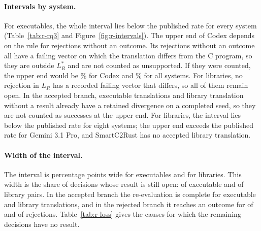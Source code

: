 \paragraph{Intervals by system.} For executables, the whole interval lies below the published rate for every system (Table~\ref{tab:r-rq3} and Figure~\ref{fig:r-intervals}). The upper end of Codex depends on the rule for rejections without an outcome. Its \rqSanBoundExeNNum{} rejections without an outcome all have a failing vector on which the translation differs from the C program, so they are outside $L_R^{\ast}$ and are not counted as unsupported. If they were counted, the upper end would be \rqSRUpNoLrStarExeAllCodexPct\% for Codex and \rqSRUpNoLrStarExeAllPct\% for all systems. For libraries, no rejection in $L_R$ has a recorded failing vector that differs, so all of them remain open. In the accepted branch, \rqLpStarRetExeAllNum{} executable translations and \rqLpStarRetLibAllNum{} library translation without a result already have a retained divergence on a completed seed, so they are not counted as successes at the upper end. For libraries, the interval lies below the published rate for eight systems; the upper end exceeds the published rate for Gemini 3.1 Pro, and SmartC2Rust has no accepted library translation.

\paragraph{Width of the interval.} The interval is \widthE{} percentage points wide for executables and \rqSRWidthTightLibAllPct{} for libraries. This width is the share of decisions whose result is still open: \openE{} of \rqPzeroExeAllNum{} executable and \rqOpenLibAllNum{} of \rqPzeroLibAllNum{} library pairs. In the accepted branch the re-evaluation is complete for  executable and  library translations, and in the rejected branch it reaches an outcome for \rqFFExeAllDen{} of \rqRZeroTestExeAllNum{} and \rqFFLibAllDen{} of \rqRZeroTestLibAllNum{} rejections. Table~\ref{tab:r-loss} gives the causes for which the remaining decisions have no result.


